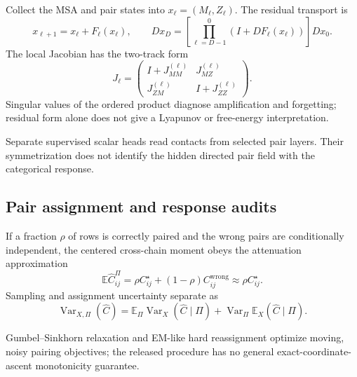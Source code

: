 Collect the MSA and pair states into $x_\ell=(M_\ell,Z_\ell)$.  The residual transport is
\begin{equation}
x_{\ell+1}=x_\ell+F_\ell(x_\ell),
\qquad
D x_D=\left[\prod_{\ell=D-1}^{0}(I+DF_\ell(x_\ell))\right]D x_0.
\label{eq:msa-pairformer-residual-transport}
\end{equation}
The local Jacobian has the two-track form
\begin{equation}
J_\ell=
\begin{pmatrix}I+J_{MM}^{(\ell)}&J_{MZ}^{(\ell)}\\
J_{ZM}^{(\ell)}&I+J_{ZZ}^{(\ell)}\end{pmatrix}.
\label{eq:msa-pairformer-two-track-jacobian}
\end{equation}
Singular values of the ordered product diagnose amplification and forgetting; residual form alone
does not give a Lyapunov or free-energy interpretation.

Separate supervised scalar heads read contacts from selected pair layers.  Their symmetrization
does not identify the hidden directed pair field with the categorical response.

\subsection{Pair assignment and response audits}

If a fraction $\rho$ of rows is correctly paired and the wrong pairs are conditionally independent,
the centered cross-chain moment obeys the attenuation approximation
\begin{equation}
\mathbb E\widehat C_{ij}^{\Pi}=\rho C_{ij}^{\star}+(1-\rho)C_{ij}^{\mathrm{wrong}}
\approx\rho C_{ij}^{\star}.
\label{eq:msa-pairformer-pairing-attenuation}
\end{equation}
Sampling and assignment uncertainty separate as
\begin{equation}
\operatorname{Var}_{X,\Pi}(\widehat C)
=\mathbb E_\Pi\operatorname{Var}_X(\widehat C\mid\Pi)
+\operatorname{Var}_\Pi\mathbb E_X(\widehat C\mid\Pi).
\label{eq:msa-pairformer-pairing-total-variance}
\end{equation}

Gumbel--Sinkhorn relaxation and EM-like hard reassignment optimize moving, noisy pairing
objectives; the released procedure has no general exact-coordinate-ascent monotonicity guarantee.

